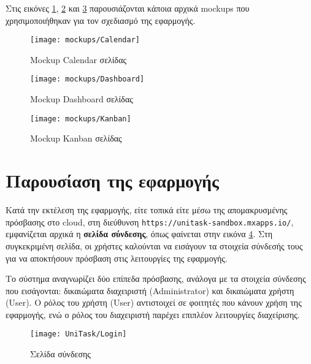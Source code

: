         Στις εικόνες \ref{fig:unitaskMockupCalendar}, \ref{fig:unitaskMockupDashboard} και \ref{fig:unitaskMockupKanban} παρουσιάζονται κάποια αρχικά mockups που χρησιμοποιήθηκαν για τον σχεδιασμό της εφαρμογής.

        \begin{figure}[h!] \noindent \centering
            \texttt{[image: mockups/Calendar]}
            \caption{\centering Mockup Calendar σελίδας}
            \label{fig:unitaskMockupCalendar}
        \end{figure}

        \begin{figure}[h!] \noindent \centering
            \texttt{[image: mockups/Dashboard]}
            \caption{\centering Mockup Dashboard σελίδας}
            \label{fig:unitaskMockupDashboard}
        \end{figure}

        \begin{figure}[h!] \noindent \centering
            \texttt{[image: mockups/Kanban]}
            \caption{\centering Mockup Kanban σελίδας}
            \label{fig:unitaskMockupKanban}
        \end{figure}

    \pagebreak

    \section{Παρουσίαση της εφαρμογής}
        Κατά την εκτέλεση της εφαρμογής, είτε τοπικά είτε μέσω της απομακρυσμένης πρόσβασης στο cloud, στη διεύθυνση \texttt{https://unitask-sandbox.mxapps.io/}, εμφανίζεται αρχικά η \textbf{σελίδα σύνδεσης}, όπως φαίνεται στην εικόνα \ref{fig:unitask_Login}. Στη συγκεκριμένη σελίδα, οι χρήστες καλούνται να εισάγουν τα στοιχεία σύνδεσής τους για να αποκτήσουν πρόσβαση στις λειτουργίες της εφαρμογής.

        Το σύστημα αναγνωρίζει δύο επίπεδα πρόσβασης, ανάλογα με τα στοιχεία σύνδεσης που εισάγονται: δικαιώματα διαχειριστή (Administrator) και δικαιώματα χρήστη (User). Ο ρόλος του χρήστη (User) αντιστοιχεί σε φοιτητές που κάνουν χρήση της εφαρμογής, ενώ ο ρόλος του διαχειριστή παρέχει επιπλέον λειτουργίες διαχείρισης.

       \begin{figure}[h!] \noindent \centering
            \texttt{[image: UniTask/Login]}
            \caption{\centering Σελίδα σύνδεσης}
            \label{fig:unitask_Login}
        \end{figure}

